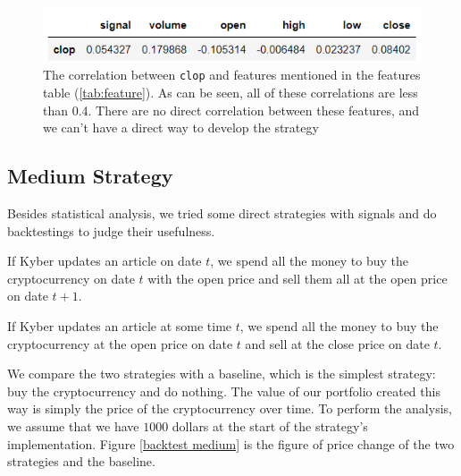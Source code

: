\documentclass[twoside]{report}
\newcommand{\code}{\texttt}
\begin{document}
\begin{spacing}{1}
\begin{figure}[!htbp]
    \centering
    \includegraphics{Images/Medium stats.png}
    \caption{The correlation between \code{clop} and features mentioned in the features table (\ref{tab:feature}). As can be seen, all of these correlations are less than 0.4. There are no direct correlation between these features, and we can't have a direct way to develop the strategy}
    \label{medium stats}
\end{figure}


\subsection{Medium Strategy }
Besides statistical analysis, we tried some direct strategies with signals and do backtestings to judge their usefulness. 



\begin{strategy}
If Kyber updates an article on date $t$, we spend all the money to buy the cryptocurrency on date $t$ with the open price and sell them all at the open price on date $t+1$.
\end{strategy}\label{strat:Kyber1}

\begin{strategy}
If Kyber updates an article at some time $t$, we spend all the money to buy the cryptocurrency at the open price on date $t$ and sell at the close price on date $t$.
\end{strategy}\label{strat:Kyber2} 

We compare the two strategies with a baseline, which is the simplest strategy: buy the cryptocurrency and do nothing. The value of our portfolio created this way is simply the price of the cryptocurrency over time. To perform the analysis, we assume that we have $1000$ dollars at the start of the strategy's implementation. Figure \ref{backtest medium} is the figure of price change of the two strategies and the baseline.


\end{spacing}
\end{document}
